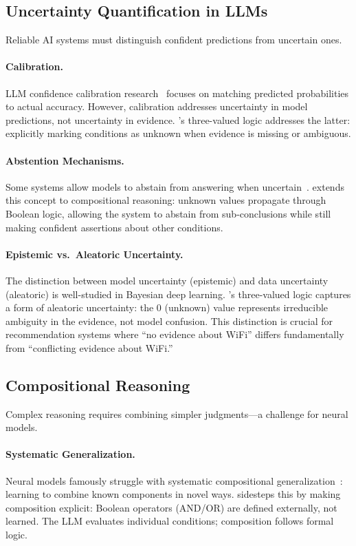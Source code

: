\subsection{Uncertainty Quantification in LLMs}

Reliable AI systems must distinguish confident predictions from uncertain ones.

\paragraph{Calibration.}
LLM confidence calibration research~\cite{kadavath2022language} focuses on matching predicted probabilities to actual accuracy.
However, calibration addresses uncertainty in model predictions, not uncertainty in evidence.
\method's three-valued logic addresses the latter: explicitly marking conditions as unknown when evidence is missing or ambiguous.

\paragraph{Abstention Mechanisms.}
Some systems allow models to abstain from answering when uncertain~\cite{kamath2020selective}.
\method extends this concept to compositional reasoning: unknown values propagate through Boolean logic, allowing the system to abstain from sub-conclusions while still making confident assertions about other conditions.

\paragraph{Epistemic vs.\ Aleatoric Uncertainty.}
The distinction between model uncertainty (epistemic) and data uncertainty (aleatoric) is well-studied in Bayesian deep learning.
\method's three-valued logic captures a form of aleatoric uncertainty: the 0 (unknown) value represents irreducible ambiguity in the evidence, not model confusion.
This distinction is crucial for recommendation systems where ``no evidence about WiFi'' differs fundamentally from ``conflicting evidence about WiFi.''

\subsection{Compositional Reasoning}

Complex reasoning requires combining simpler judgments---a challenge for neural models.

\paragraph{Systematic Generalization.}
Neural models famously struggle with systematic compositional generalization~\cite{lake2018generalization}: learning to combine known components in novel ways.
\method sidesteps this by making composition explicit: Boolean operators (AND/OR) are defined externally, not learned.
The LLM evaluates individual conditions; composition follows formal logic.

